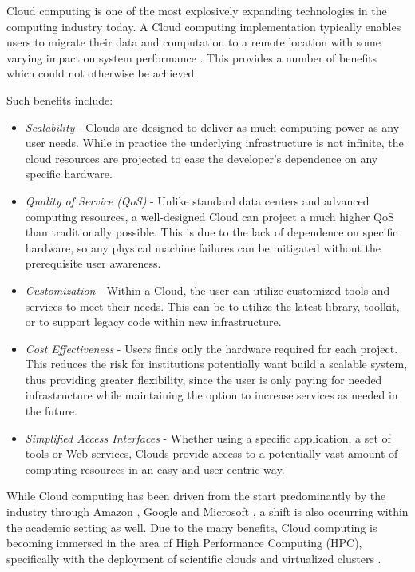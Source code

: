 Cloud computing \cite{Armbrust2010} is one of the most explosively expanding technologies in the computing industry today. A Cloud computing implementation typically enables users to migrate their data and computation to a remote location with some varying impact on system performance \cite{Wang2010}.  This provides a number of benefits which could not otherwise be achieved. 

 
Such benefits include:

\begin{itemize}

\item{\em Scalability} - Clouds are designed to deliver as much computing power as any user needs.  While in practice the underlying infrastructure is not infinite, the cloud resources are projected to ease the developer's dependence on any specific hardware.

\item{\em Quality of Service (QoS)} - Unlike standard data centers and advanced computing resources, a well-designed Cloud can project a much higher QoS than traditionally possible.  This is due to the lack of dependence on specific hardware, so any physical machine failures can be mitigated without the prerequisite user awareness.

\item{\em Customization} - Within a Cloud, the user can utilize customized tools and services to meet their needs. This can be to utilize the latest library, toolkit, or to support legacy code within new infrastructure.  

\item{\em Cost Effectiveness} - Users finds only the hardware required for each project.  This reduces the risk for institutions potentially want build a scalable system, thus providing greater flexibility, since the user is only paying for needed infrastructure while maintaining the option to increase services as needed in the future.

\item{\em Simplified Access Interfaces} - Whether using a specific application, a set of tools or Web services, Clouds provide access to a potentially vast amount of computing resources in an easy and user-centric way. 

\end{itemize}

While Cloud computing has been driven from the start predominantly by the industry through Amazon \cite{EC2}, Google \cite{Ciurana2009} and Microsoft \cite{Chappell2009}, a shift is also occurring within the academic setting as well.  Due to the many benefits, Cloud computing is becoming immersed in the area of High Performance Computing (HPC), specifically with the deployment of scientific clouds \cite{Keahey2008} and virtualized clusters \cite{Foster2006}.  


